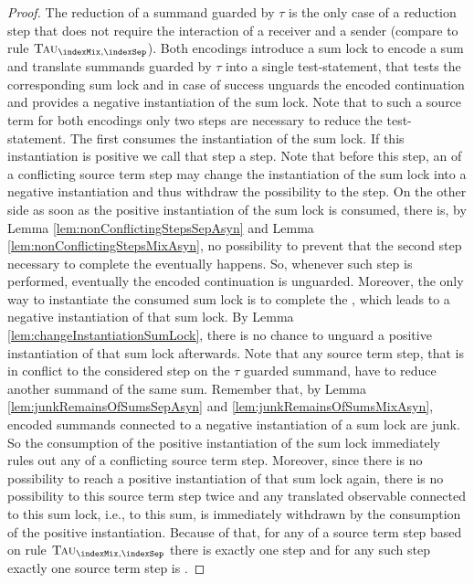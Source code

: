 \documentclass[]{llncs}
\begin{document}
\begin{proof}
	The reduction of a summand guarded by $ \tau $ is the only case of a reduction step that does not require the interaction of a receiver and a sender (compare to rule $ \textsc{Tau}_{\indexMix, \indexSep} $). Both encodings introduce a sum lock to encode a sum and translate summands guarded by $ \tau $ into a single test-statement, that tests the corresponding sum lock and in case of success unguards the encoded continuation and provides a negative instantiation of the sum lock. Note that to \simulate such a source term for both encodings only two steps are necessary to reduce the test-statement. The first consumes the instantiation of the sum lock. If this instantiation is positive we call that step a \nonAdmin step. Note that before this step, an \simulation of a conflicting source term step may change the instantiation of the sum lock into a negative instantiation and thus withdraw the possibility to \simulate the step. On the other side as soon as the positive instantiation of the sum lock is consumed, there is, by Lemma \ref{lem:nonConflictingStepsSepAsyn} and Lemma \ref{lem:nonConflictingStepsMixAsyn}, no possibility to prevent that the second step necessary to complete the \simulation eventually happens. So, whenever such \nonAdmin step is performed, eventually the encoded continuation is unguarded. Moreover, the only way to instantiate the consumed sum lock is to complete the \simulation, which leads to a negative instantiation of that sum lock. By Lemma \ref{lem:changeInstantiationSumLock}, there is no chance to unguard a positive instantiation of that sum lock afterwards. Note that any source term step, that is in conflict to the considered step on the $ \tau $ guarded summand, have to reduce another summand of the same sum. Remember that, by Lemma \ref{lem:junkRemainsOfSumsSepAsyn} and \ref{lem:junkRemainsOfSumsMixAsyn}, encoded summands connected to a negative instantiation of a sum lock are junk. So the consumption of the positive instantiation of the sum lock immediately rules out any \simulation of a conflicting source term step. Moreover, since there is no possibility to reach a positive instantiation of that sum lock again, there is no possibility to \simulate this source term step twice and any translated observable connected to this sum lock, i.e., to this sum, is immediately withdrawn by the consumption of the positive instantiation. Because of that, for any \simulation of a source term step based on rule $ \textsc{Tau}_{\indexMix, \indexSep} $ there is exactly one \nonAdmin step and for any such \nonAdmin step exactly one source term step is \simulated.
	

\end{proof}
\end{document}
